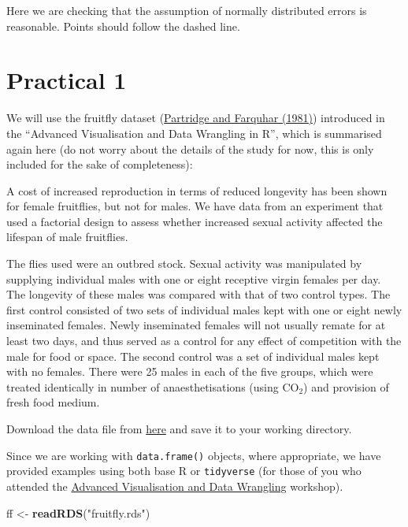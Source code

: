 \documentclass[]{book}
\newenvironment{Shaded}{\begin{snugshade}}{\end{snugshade}}
\newcommand{\KeywordTok}[1]{\textcolor[rgb]{0.13,0.29,0.53}{\textbf{#1}}}
\newcommand{\StringTok}[1]{\textcolor[rgb]{0.31,0.60,0.02}{#1}}
\newcommand{\NormalTok}[1]{#1}
\theoremstyle{definition}
\theoremstyle{definition}
\theoremstyle{definition}
\theoremstyle{remark}
\begin{document}
Here we are checking that the assumption of normally distributed errors
is reasonable. Points should follow the dashed line.

\hypertarget{sec:practical1}{\section{Practical
1}\label{sec:practical1}}

We will use the fruitfly dataset
(\href{https://www.nature.com/articles/294580a0}{Partridge and Farquhar
(1981)}) introduced in the ``Advanced Visualisation and Data Wrangling
in R'', which is summarised again here (do not worry about the details
of the study for now, this is only included for the sake of
completeness):

A cost of increased reproduction in terms of reduced longevity has been
shown for female fruitflies, but not for males. We have data from an
experiment that used a factorial design to assess whether increased
sexual activity affected the lifespan of male fruitflies.

The flies used were an outbred stock. Sexual activity was manipulated by
supplying individual males with one or eight receptive virgin females
per day. The longevity of these males was compared with that of two
control types. The first control consisted of two sets of individual
males kept with one or eight newly inseminated females. Newly
inseminated females will not usually remate for at least two days, and
thus served as a control for any effect of competition with the male for
food or space. The second control was a set of individual males kept
with no females. There were 25 males in each of the five groups, which
were treated identically in number of anaesthetisations (using
\(\mathrm{CO}_2\)) and provision of fresh food medium.

Download the data file from
\href{https://exeter-data-analytics.github.io/StatModelling/_data/fruitfly.rds}{here}
and save it to your working directory.

Since we are working with \texttt{data.frame()} objects, where
appropriate, we have provided examples using both base R or
\texttt{tidyverse} (for those of you who attended the
\href{https://exeter-data-analytics.github.io/AdVis/}{Advanced
Visualisation and Data Wrangling} workshop).

\begin{Shaded}
\begin{Highlighting}[]
\NormalTok{ff <-}\StringTok{ }\KeywordTok{readRDS}\NormalTok{(}\StringTok{"fruitfly.rds"}\NormalTok{)}
\end{Highlighting}
\end{Shaded}
\end{document}
